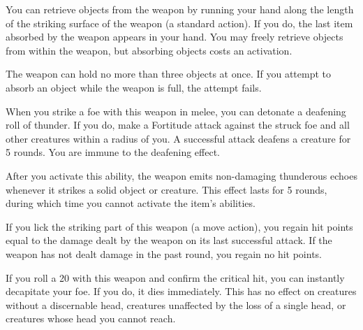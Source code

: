 You can retrieve objects from the weapon by running your hand along the length of the striking surface of the weapon (a standard action).
If you do, the last item absorbed by the weapon appears in your hand.
You may freely retrieve objects from within the weapon, but absorbing objects costs an activation.

The weapon can hold no more than three objects at once.
If you attempt to absorb an object while the weapon is full, the attempt fails.


 When you strike a foe with this weapon in melee, you can detonate a deafening roll of thunder.
If you do, make a Fortitude attack against the struck foe and all other creatures within a \areasmall radius of you.
A successful attack deafens a creature for 5 rounds.
You are immune to the deafening effect.

After you activate this ability, the weapon emits non-damaging thunderous echoes whenever it strikes a solid object or creature.
This effect lasts for 5 rounds, during which time you cannot activate the item's abilities.


 If you lick the striking part of this weapon (a move action), you regain hit points equal to the damage dealt by the weapon on its last successful attack.
If the weapon has not dealt damage in the past round, you regain no hit points.


 If you roll a 20 with this weapon and confirm the critical hit, you can instantly decapitate your foe.
If you do, it dies immediately.
This has no effect on creatures without a discernable head, creatures unaffected by the loss of a single head, or creatures whose head you cannot reach.


